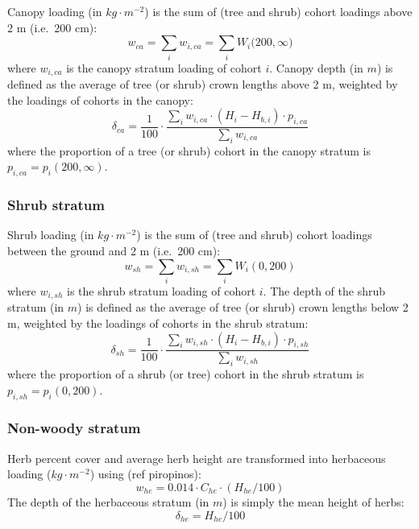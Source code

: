 \documentclass[]{book}
\begin{document}
Canopy loading (in \(kg\cdot m^{-2}\)) is the sum of (tree and shrub) cohort loadings above 2 m (i.e.~200 cm):
\begin{equation}
w_{ca} = \sum_{i}w_{i,ca} =\sum_{i}{W_i(200, \infty})
\end{equation}
where \(w_{i,ca}\) is the canopy stratum loading of cohort \(i\). Canopy depth (in \(m\)) is defined as the average of tree (or shrub) crown lengths above 2 m, weighted by the loadings of cohorts in the canopy:
\begin{equation}
\delta_{ca} = \frac{1}{100}\cdot\frac{\sum_{i}{w_{i,ca}\cdot (H_i - H_{b,i})\cdot p_{i,ca} }}{\sum_{i}{w_{i,ca}}}
\end{equation}
where the proportion of a tree (or shrub) cohort in the canopy stratum is \(p_{i,ca}=p_{i}(200,\infty)\).

\hypertarget{shrub-stratum}{%
\subsubsection{Shrub stratum}\label{shrub-stratum}}

Shrub loading (in \(kg\cdot m^{-2}\)) is the sum of (tree and shrub) cohort loadings between the ground and 2 m (i.e.~200 cm):
\begin{equation}
w_{sh} = \sum_{i}w_{i,sh} =\sum_{i}W_i(0, 200)
\end{equation}
where \(w_{i,sh}\) is the shrub stratum loading of cohort \(i\). The depth of the shrub stratum (in \(m\)) is defined as the average of tree (or shrub) crown lengths below 2 m, weighted by the loadings of cohorts in the shrub stratum:
\begin{equation}
\delta_{sh} = \frac{1}{100}\cdot \frac{\sum_{i}{w_{i,sh}\cdot (H_i - H_{b,i})\cdot p_{i,sh} }}{\sum_{i}{w_{i,sh}}}
\end{equation}
where the proportion of a shrub (or tree) cohort in the shrub stratum is \(p_{i,sh}=p_{i}(0,200)\).

\hypertarget{non-woody-stratum}{%
\subsubsection{Non-woody stratum}\label{non-woody-stratum}}

Herb percent cover and average herb height are transformed into herbaceous loading (\(kg\cdot m^{-2}\)) using (ref piropinos):
\begin{equation}
w_{he} = 0.014 \cdot C_{he} \cdot (H_{he}/100)
\end{equation}
The depth of the herbaceous stratum (in \(m\)) is simply the mean height of herbs:
\begin{equation}
\delta_{he} = H_{he}/100
\end{equation}
\end{document}
